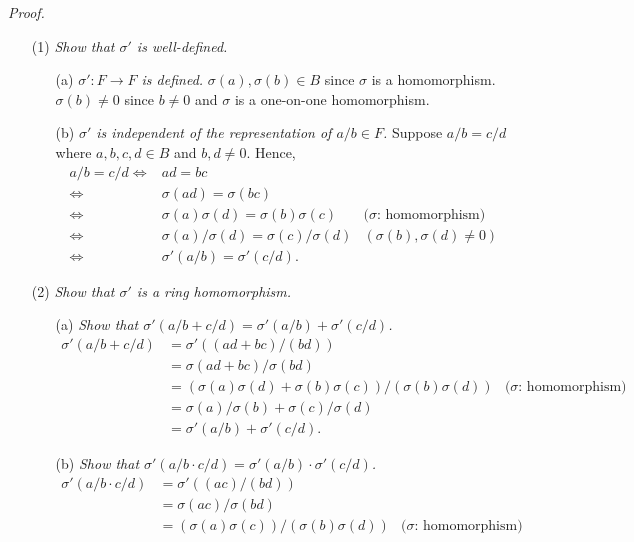\documentclass{article}
\begin{document}
\emph{Proof.}
\begin{enumerate}
\item[(1)]
\emph{Show that $\sigma'$ is well-defined.}
  \begin{enumerate}
  \item[(a)]
  \emph{$\sigma': F \to F$ is defined.}
  $\sigma(a), \sigma(b) \in B$ since $\sigma$ is a homomorphism.
  $\sigma(b) \neq 0$ since $b \neq 0$ and $\sigma$ is a one-on-one homomorphism.
  \item[(b)]
  \emph{$\sigma'$ is independent of the representation of $a/b \in F$.}
  Suppose $a/b = c/d$ where $a, b, c, d \in B$ and $b, d \neq 0$.
  Hence,
  \begin{align*}
  a/b = c/d
  \Longleftrightarrow&
  ad = bc \\
  \Longleftrightarrow&
  \sigma(ad) = \sigma(bc) \\
  \Longleftrightarrow&
  \sigma(a)\sigma(d) = \sigma(b)\sigma(c)
    &\text{($\sigma$: homomorphism)} \\
  \Longleftrightarrow&
  \sigma(a)/\sigma(d) = \sigma(c)/\sigma(d)
    &(\sigma(b), \sigma(d) \neq 0) \\
  \Longleftrightarrow&
  \sigma'(a/b) = \sigma'(c/d).
  \end{align*}
  \end{enumerate}
\item[(2)]
\emph{Show that $\sigma'$ is a ring homomorphism.}
  \begin{enumerate}
  \item[(a)]
  \emph{Show that $\sigma'(a/b + c/d) = \sigma'(a/b) + \sigma'(c/d)$.}
  \begin{align*}
  \sigma'(a/b + c/d)
  &= \sigma'((ad+bc)/(bd)) \\
  &= \sigma(ad+bc) / \sigma(bd) \\
  &= (\sigma(a)\sigma(d)+\sigma(b)\sigma(c)) / (\sigma(b)\sigma(d))
    &\text{($\sigma$: homomorphism)} \\
  &= \sigma(a)/\sigma(b) + \sigma(c)/\sigma(d) \\
  &= \sigma'(a/b) + \sigma'(c/d).
  \end{align*}
  \item[(b)]
  \emph{Show that $\sigma'(a/b \cdot c/d) = \sigma'(a/b) \cdot \sigma'(c/d)$.}
  \begin{align*}
  \sigma'(a/b \cdot c/d)
  &= \sigma'((ac)/(bd)) \\
  &= \sigma(ac) / \sigma(bd) \\
  &= (\sigma(a)\sigma(c)) / (\sigma(b)\sigma(d))
    &\text{($\sigma$: homomorphism)} \\

\end{align*}
\end{enumerate}
\end{enumerate}
\end{document}
